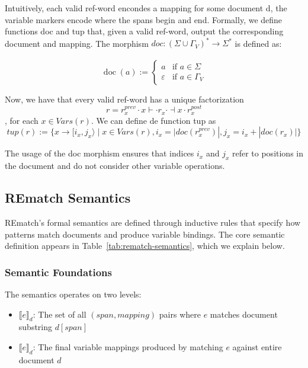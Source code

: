 \documentclass{article}
\begin{document}
Intuitively, each valid ref-word encondes a mapping for some document d, the variable markers encode where the spans begin and end. Formally, we define functions doc and tup that, given a valid ref-word, output the corresponding document and mapping. The morphism $doc: (\Sigma \cup \Gamma_V)^* \xrightarrow[]{} \Sigma^*$ is defined as:

\[
\operatorname{doc}(a) :=
\begin{cases}
a & \text{if } a \in \Sigma \\[6pt]
\varepsilon & \text{if } a \in \Gamma_V
\end{cases}
\]


Now, we have that every valid ref-word has a unique factorization\[r = r_x^{prev} \cdot x\vdash \cdot r_x \cdot \dashv x \cdot r_x^{post}\], for each $x \in Vars(r)$. We can define de function tup as \[tup(r) := \{x \xrightarrow[]{} [i_x, j_x\rangle \; | \; x \in Vars(r), i_x = |doc(r^{prev}_x)|, j_x = i_x + |doc(r_x)|\}\]

The usage of the doc morphism ensures that indices $i_x$ and $j_x$  refer to positions in the document and do not consider other variable operations. 
\subsection{REmatch Semantics}
\label{sec:rematch-semantics}

REmatch's formal semantics are defined through inductive rules that specify how patterns match documents and produce variable bindings. The core semantic definition appears in Table~\ref{tab:rematch-semantics}, which we explain below.

\subsubsection{Semantic Foundations}
The semantics operates on two levels:
\begin{itemize}
    \item $\llbracket e \rrbracket_d$: The set of all $(span, mapping)$ pairs where $e$ matches document substring $d[span]$
    \item  $\llbracket e \rrbracket_d$: The final variable mappings produced by matching $e$ against entire document $d$
\end{itemize}
\end{document}
